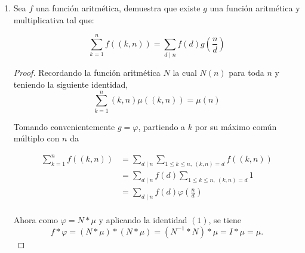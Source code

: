 \documentclass[letterpaper]{article}
\begin{document}
\begin{enumerate}
Ahora solo hace falta probar $(*)$, ósea
\[
    \sum_{i=1}^{n}i^3 = \left( \sum_{i=1}^{n}i \right)^2
\]
\begin{proof} \textbf{Por inducción}

    Tenemos que $\sum_{i=1}^{n} i = \frac{n(n+1)}{2}$, entonces
    $\left( \sum_{i=1}^{n} i \right)^2 = \frac{n^2(n+1)^2}{4}$.
    Mostrar por inducción que
    \[
        \sum_{i=1}^{n}i^3 = \frac{n^2(n+1)^2}{4}
    \]
    \emph{Paso inductivo con $n=k+1$,}
    \begin{align*}
        \sum_{i=1}^{k+1}i^3
            &= \sum_{i=1}^{k}i^3 + (k+1)^3\\
            &= \frac{k^2(k+1)^2}{4} + (k+1)^3\\
            &= \frac{k^4 + 2k^3 + k^2}{4} + \frac{4k^3 + 12k^2 + 12k + 4} {4}\\
            &= \frac {k^4 + 6k^3 + 13k^2 + 12k + 4} {4}\\
            &= \frac {(k + 1)^2 (k + 2)^2} {4}
    \end{align*}
\end{proof}
Por tanto $\sum_{d \mid n} \tau(d)^3 = \left( \sum_{d \mid n} \tau(d) \right)^2$.
\item Sea $f$ una función aritmética, demuestra que existe $g$ una función aritmética y multiplicativa tal que:

\[ \sum_{k=1}^{n} f((k,n)) = \sum_{d \mid n} f(d)g \left( \frac{n}{d} \right) \]

\begin{proof}
Recordando la función aritmética $N$ la cual $N(n)$ para toda $n$ y teniendo la siguiente identidad,
\[
    \sum_{k=1}^{n} (k,n) \mu((k,n)) = \mu(n) \tag{1}
\]

Tomando convenientemente $g = \varphi$, partiendo a $k$ por su máximo común múltiplo con $n$ da

\begin{align*}
    \sum_{k=1}^{n} f((k,n))
        &= \sum_{d \mid n} \sum_{1 \leq k \leq n,\ (k,n)=d} f((k,n))\\
        &= \sum_{d \mid n} f(d) \sum_{1 \leq k \leq n,\ (k,n)=d} 1\\
        &= \sum_{d \mid n} f(d) \varphi \left( \frac{n}{d} \right)\\
\end{align*}

Ahora como $\varphi = N \ast \mu$ y aplicando la identidad $(1)$, se tiene
\[
    f \ast \varphi = (N \ast \mu) \ast (N \ast \mu) = (N^{-1} \ast N) \ast \mu = I \ast \mu = \mu.
\]
\end{proof}


\end{enumerate}
\end{document}
